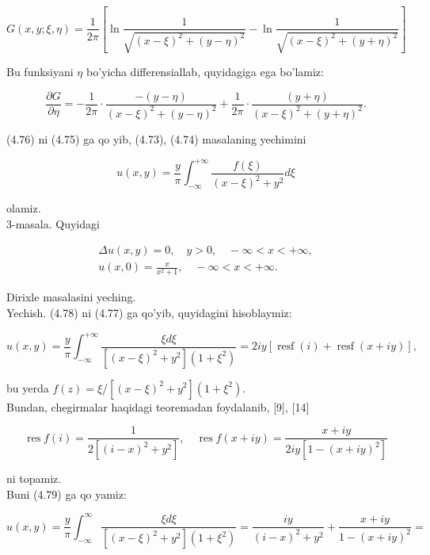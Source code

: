 \documentclass[10pt]{article}
\begin{document}
$$
G(x, y ; \xi, \eta)=\frac{1}{2 \pi}\left[\ln \frac{1}{\sqrt{(x-\xi)^{2}+(y-\eta)^{2}}}-\ln \frac{1}{\sqrt{(x-\xi)^{2}+(y+\eta)^{2}}}\right]
$$

Bu funksiyani $\eta$ bo'yicha differensiallab, quyidagiga ega bo'lamiz:


\begin{equation*}
\frac{\partial G}{\partial \eta}=-\frac{1}{2 \pi} \cdot \frac{-(y-\eta)}{(x-\xi)^{2}+(y-\eta)^{2}}+\frac{1}{2 \pi} \cdot \frac{(y+\eta)}{(x-\xi)^{2}+(y+\eta)^{2}} . \tag{4.76}
\end{equation*}


(4.76) ni (4.75) ga qo yib, (4.73), (4.74) masalaning yechimini


\begin{equation*}
u(x, y)=\frac{y}{\pi} \int_{-\infty}^{+\infty} \frac{f(\xi)}{(x-\xi)^{2}+y^{2}} d \xi \tag{4.77}
\end{equation*}


olamiz.\\
3-masala. Quyidagi


\begin{gather*}
\Delta u(x, y)=0, \quad y>0, \quad-\infty<x<+\infty,  \tag{4.73}\\
u(x, 0)=\frac{x}{x^{2}+1}, \quad-\infty<x<+\infty . \tag{4.78}
\end{gather*}


Dirixle masalasini yeching.\\
Yechish. (4.78) ni (4.77) ga qo'yib, quyidagini hisoblaymiz:


\begin{equation*}
u(x, y)=\frac{y}{\pi} \int_{-\infty}^{+\infty} \frac{\xi d \xi}{\left[(x-\xi)^{2}+y^{2}\right]\left(1+\xi^{2}\right)}=2 i y[\operatorname{resf}(i)+\operatorname{resf}(x+i y)], \tag{4.79}
\end{equation*}


bu yerda $f(z)=\xi /\left[(x-\xi)^{2}+y^{2}\right]\left(1+\xi^{2}\right)$.\\[0pt]
Bundan, chegirmalar haqidagi teoremadan foydalanib, [9], [14]


\begin{equation*}
\operatorname{res} f(i)=\frac{1}{2\left[(i-x)^{2}+y^{2}\right]}, \quad \operatorname{res} f(x+i y)=\frac{x+i y}{2 i y\left[1-(x+i y)^{2}\right]} \tag{4,80}
\end{equation*}


ni topamiz.\\
Buni (4.79) ga qo yamiz:

$$
u(x, y)=\frac{y}{\pi} \int_{-\infty}^{\infty} \frac{\xi d \xi}{\left[(x-\xi)^{2}+y^{2}\right]\left(1+\xi^{2}\right)}=\frac{i y}{(i-x)^{2}+y^{2}}+\frac{x+i y}{1-(x+i y)^{2}}=
$$
\end{document}
